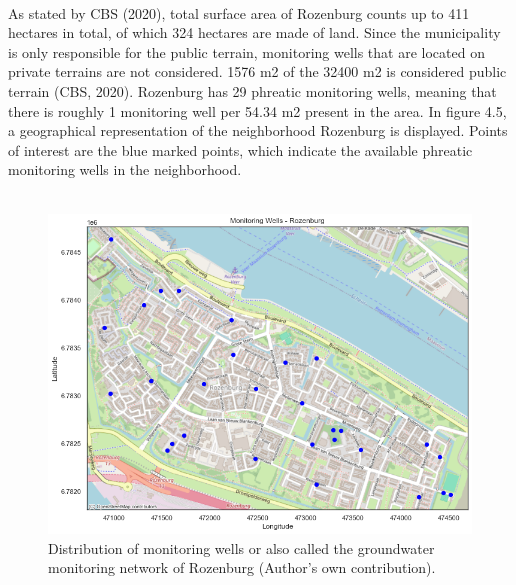 \\
As stated by CBS (2020),  total surface area of Rozenburg counts up to 411 hectares in total, of which 324 hectares are made of land. Since the municipality is only responsible for the public terrain, monitoring wells that are located on private terrains are not considered. 1576 m2 of the 32400 m2 is considered public terrain (CBS, 2020). Rozenburg has 29 phreatic monitoring wells, meaning that there is roughly 1 monitoring well per 54.34 m2 present in the area. In figure 4.5, a geographical representation of the neighborhood Rozenburg is displayed. Points of interest are the blue marked points, which indicate the available phreatic monitoring wells in the neighborhood. \\
\\
\begin{figure}[htbp]
    \centering
    \includegraphics[width=0.75\linewidth]{figures/roz/basic_roz.png}
    \caption{Distribution of monitoring wells or also called the groundwater monitoring network of Rozenburg (Author's own contribution).}
\end{figure}\\
\\
\newpage
\\
